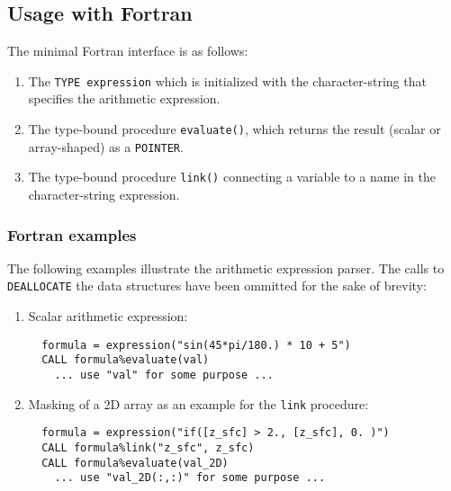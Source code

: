 \subsection{Usage with Fortran}
\label{section:usage_with_fortran}

The minimal Fortran interface is as follows:
\begin{enumerate}
\item The \texttt{TYPE expression} which is initialized with the
  character-string that specifies the arithmetic expression.
\item The type-bound procedure \texttt{evaluate()}, which returns the
  result (scalar or array-shaped) as a \texttt{POINTER}.
\item The type-bound procedure \texttt{link()} connecting a variable
 to a name in the character-string expression.
\end{enumerate}


\subsubsection{Fortran examples}

The following examples illustrate the arithmetic expression parser.
The calls to \texttt{DEALLOCATE} the data structures have been
ommitted for the sake of brevity:

\begin{enumerate}
  \item Scalar arithmetic expression:
   \begin{verbatim}
  formula = expression("sin(45*pi/180.) * 10 + 5")
  CALL formula%evaluate(val)
    ... use "val" for some purpose ...
   \end{verbatim}
  \item Masking of a 2D array as an example for the \texttt{link} procedure:
    \begin{verbatim}
  formula = expression("if([z_sfc] > 2., [z_sfc], 0. )")
  CALL formula%link("z_sfc", z_sfc)
  CALL formula%evaluate(val_2D)
    ... use "val_2D(:,:)" for some purpose ...
   \end{verbatim}
\end{enumerate}
  





